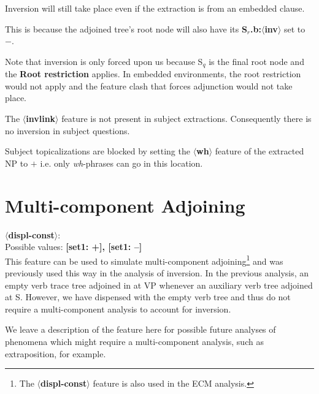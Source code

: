 Inversion will still take place even if the extraction is from an embedded
clause.


This is because the adjoined tree's root node will also have its 
{\bf S$_{r}$.b:$\langle$inv$\rangle$} set to $-$. 


Note that inversion is only forced upon us because S$_{q}$ is the
final root node and the {\bf Root restriction} applies. In embedded
environments, the root restriction would not apply and the feature
clash that forces adjunction would not take place.

The {\bf $\langle$invlink$\rangle$} feature is not present in subject
extractions.  Consequently there is no inversion in subject questions.

Subject topicalizations are blocked by setting the 
{\bf $\langle$wh$\rangle$} feature of the extracted NP to $+$ i.e. only
{\em wh}-phrases can go in this location. 


\section{Multi-component Adjoining}

{\bf $\langle$displ-const$\rangle$}:\\ Possible values: {\bf [set1: +], [set1:
--]}\\ This feature can be used to simulate multi-component
adjoining\footnote{The {\bf $\langle$displ-const$\rangle$} feature is also used
in the ECM analysis.} and was previously used this way in the analysis of
inversion. In the previous analysis, an empty verb trace tree adjoined in
at VP whenever an auxiliary verb tree adjoined at S.
However, we have dispensed with the empty verb tree and thus do not require a
multi-component analysis to account for inversion.

We leave a description of the feature here for possible future analyses of
phenomena which might require a multi-component analysis, such as
extraposition, for example. 

